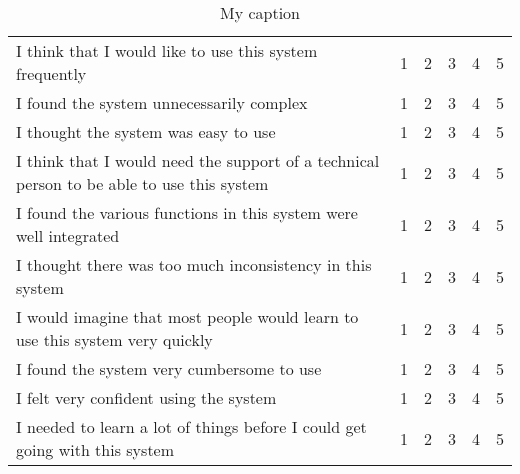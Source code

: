 \documentclass[12pt,twoside,a4paper]{article}
\begin{document}
\begin{table}[]
\centering
\caption{My caption}
\label{my-label}
\begin{tabular}{L{0.5\textwidth}|C{0.1\textwidth}|C{0.1\textwidth}|C{0.1\textwidth}|C{0.1\textwidth}|C{0.1\textwidth}|}
I think that I would like to use this system frequently                                   & 1 & 2 & 3 & 4 & 5 \\  
I found the system unnecessarily complex                                                  & 1 & 2 & 3 & 4 & 5 \\  
I thought the system was easy to use                                                      & 1 & 2 & 3 & 4 & 5 \\  
I think that I would need the support of a technical person to be able to use this system & 1 & 2 & 3 & 4 & 5 \\  
I found the various functions in this system were well integrated                         & 1 & 2 & 3 & 4 & 5 \\  
I thought there was too much inconsistency in this system                                 & 1 & 2 & 3 & 4 & 5 \\  
I would imagine that most people would learn to use this system very quickly              & 1 & 2 & 3 & 4 & 5 \\  
I found the system very cumbersome to use                                                 & 1 & 2 & 3 & 4 & 5 \\  
I felt very confident using the system                                                    & 1 & 2 & 3 & 4 & 5 \\  
I needed to learn a lot of things before I could get going with this system               & 1 & 2 & 3 & 4 & 5 \\  
\end{tabular}
\end{table}
\end{document}
